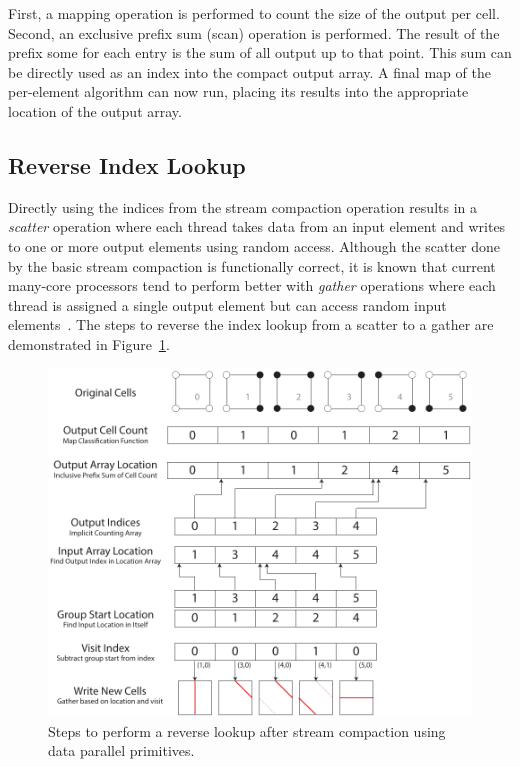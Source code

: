 \documentclass{superfri}
\newcommand*{\lcite}[1]{~\cite{#1}}
\newcommand*{\keyterm}[1]{\emph{#1}}
\begin{document}
First, a mapping operation is performed to count the size of the output per
cell. Second, an exclusive prefix sum (scan) operation is performed. The
result of the prefix some for each entry is the sum of all output up to
that point. This sum can be directly used as an index into the compact
output array. A final map of the per-element algorithm can now run, placing
its results into the appropriate location of the output array.

\subsection{Reverse Index Lookup}

\noindent
Directly using the indices from the stream compaction operation results in
a \keyterm{scatter} operation where each thread takes data from an input
element and writes to one or more output elements using random access.
Although the scatter done by the basic stream compaction is functionally
correct, it is known that current many-core processors tend to perform
better with \keyterm{gather} operations where each thread is assigned a
single output element but can access random input
elements\lcite{Stratton2012}. The steps to reverse the index lookup from a
scatter to a gather are demonstrated in Figure~\ref{fig:ReverseLookup}.

\begin{figure}[htb]
  \centering
  \includegraphics[scale=.9]{images/ReverseLookup}
  \caption{Steps to perform a reverse lookup after stream compaction using
    data parallel primitives.}
  \label{fig:ReverseLookup}
\end{figure}
\end{document}

